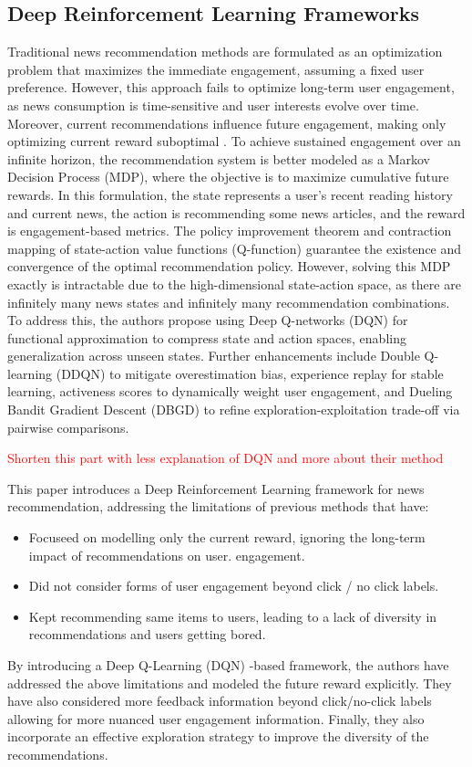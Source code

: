 \documentclass{ieeetj}
\begin{document}
\subsection{Deep Reinforcement Learning Frameworks\cite{zheng_drn_2018}}

Traditional news recommendation methods are formulated as an optimization problem that maximizes the immediate engagement, assuming a fixed user preference. However, this approach fails to optimize long-term user engagement, as news consumption is time-sensitive and user interests evolve over time. Moreover, current recommendations influence future engagement, making only optimizing current reward suboptimal \cite{zheng_drn_2018}. To achieve sustained engagement over an infinite horizon, the recommendation system is better modeled as a Markov Decision Process (MDP), where the objective is to maximize cumulative future rewards. In this formulation, the state represents a user's recent reading history and current news, the action is recommending some news articles, and the reward is engagement-based metrics\cite{zheng_drn_2018}. The policy improvement theorem and contraction mapping of state-action value functions (Q-function) guarantee the existence and convergence of the optimal recommendation policy. However, solving this MDP exactly is intractable due to the high-dimensional state-action space, as there are infinitely many news states and infinitely many recommendation combinations. To address this, the authors propose using Deep Q-networks (DQN) for functional approximation to compress state and action spaces, enabling generalization across unseen states\cite{zheng_drn_2018}. Further enhancements include Double Q-learning (DDQN) to mitigate overestimation bias, experience replay for stable learning, activeness scores to dynamically weight user engagement, and Dueling Bandit Gradient Descent (DBGD) to refine exploration-exploitation trade-off via pairwise comparisons. 

\textcolor{red}{Shorten this part with less explanation of DQN and more about their method}

This paper introduces a Deep Reinforcement Learning framework for news recommendation, addressing the limitations of previous methods that have:
\begin{itemize}
	\item Focuseed on modelling only the current reward, ignoring the long-term impact of recommendations on user. engagement.
	\item Did not consider forms of user engagement beyond click / no click labels.
	\item Kept recommending same items to users, leading to a lack of diversity in recommendations and users getting bored.
\end{itemize}
By introducing a Deep Q-Learning (DQN) -based framework, the authors have addressed the above limitations and modeled the future reward explicitly. They have also considered more feedback information beyond click/no-click labels allowing for more nuanced user engagement information. Finally, they also incorporate an effective exploration strategy to improve the diversity of the recommendations.
\end{document}
